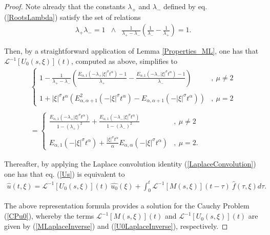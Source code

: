 \documentclass{amsart}
\theoremstyle{definition}
\theoremstyle{remark}
\numberwithin{equation}{section}
\begin{document}
\begin{proof}
	Note already that the constants $\lambda_+$ and $\lambda_-$ defined by eq. (\ref{RootsLambda}) satisfy the set of relations
	\begin{eqnarray}
		\label{RootsProperties}\lambda_+\lambda_-=1&\wedge &\displaystyle \frac{1}{\lambda_+-\lambda_-}\left(\frac{1}{\lambda_-}-\frac{1}{\lambda_+}\right)=1.
	\end{eqnarray}
	
	Then, by a straightforward application of Lemma \ref{Properties_ML}, one has that $\mathcal{L}^{-1}[U_0(s,\xi)](t)$, computed as above, simplifies to
	\begin{eqnarray}\label{U0LaplaceInverse}
			\begin{cases}
				\displaystyle 	1-\frac{1}{\lambda_+-\lambda_-}\left(\frac{E_{\alpha,1}(-\lambda_+|\xi|^\sigma t^\alpha)-1}{\lambda_+}-\frac{E_{\alpha,1}(-\lambda_-|\xi|^\sigma t^\alpha)-1}{\lambda_-}\right) &,~\mu\neq 2 \\ \ \\
				\displaystyle 1+|\xi|^{\sigma}t^{\alpha}\left(E_{\alpha,\alpha+1}^2(-|\xi|^\sigma t^{\alpha})-E_{\alpha,\alpha+1}(-|\xi|^\sigma t^{\alpha})\right)&,~\mu= 2
			\end{cases} \nonumber \\ \nonumber \\
			=\begin{cases}
				\displaystyle 	\frac{E_{\alpha,1}(-\lambda_+|\xi|^\sigma t^\alpha)}{1-(\lambda_+)^2}+\frac{E_{\alpha,1}(-\lambda_-|\xi|^\sigma t^\alpha)}{1-(\lambda_-)^2} &,~\mu\neq 2 \\ \ \\
				\displaystyle E_{\alpha,1}(-|\xi|^\sigma t^\alpha)+\frac{|\xi|^{\sigma}t^{\alpha}}{\alpha}E_{\alpha,\alpha}(-|\xi|^\sigma t^{\alpha})&,~\mu= 2.
			\end{cases}
	\end{eqnarray}
	
	Thereafter, by applying the Laplace convolution identity (\ref{LaplaceConvolution}) one has that eq. (\ref{Us}) is equivalent to
	\begin{eqnarray}
		\label{LaplaceFsx}
		\widehat{u}(t,\xi)=\mathcal{L}^{-1}[U_0(s,\xi)](t)~\widehat{u_0}(\xi)+\int_{0}^t \mathcal{L}^{-1}[M(s,\xi)](t-\tau)~\widehat{f}(\tau,\xi)d\tau.
	\end{eqnarray}
	
	The above representation formula provides a solution for the Cauchy Problem (\ref{CPu0}), whereby the terms $\mathcal{L}^{-1}[M(s,\xi)](t)$ and $\mathcal{L}^{-1}[U_0(s,\xi)](t)$ are given by (\ref{MLaplaceInverse}) and (\ref{U0LaplaceInverse}), respectively. 
	

\end{proof}
\end{document}
